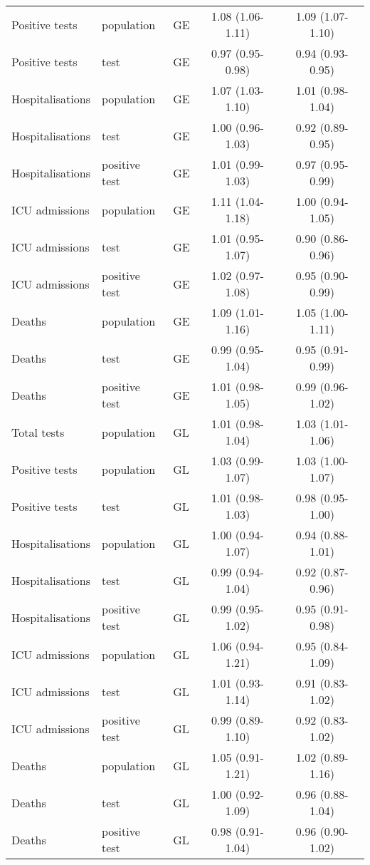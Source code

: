 \documentclass{article}
\begin{document}
\begin{longtable}{lllcc}
		Positive tests & population & GE & 1.08 (1.06-1.11) & 1.09 (1.07-1.10) \\ 
		Positive tests & test & GE & 0.97 (0.95-0.98) & 0.94 (0.93-0.95) \\ 
		Hospitalisations & population & GE & 1.07 (1.03-1.10) & 1.01 (0.98-1.04) \\ 
		Hospitalisations & test & GE & 1.00 (0.96-1.03) & 0.92 (0.89-0.95) \\ 
		Hospitalisations & positive test & GE & 1.01 (0.99-1.03) & 0.97 (0.95-0.99) \\ 
		ICU admissions & population & GE & 1.11 (1.04-1.18) & 1.00 (0.94-1.05) \\ 
		ICU admissions & test & GE & 1.01 (0.95-1.07) & 0.90 (0.86-0.96) \\ 
		ICU admissions & positive test & GE & 1.02 (0.97-1.08) & 0.95 (0.90-0.99) \\ 
		Deaths & population & GE & 1.09 (1.01-1.16) & 1.05 (1.00-1.11) \\ 
		Deaths & test & GE & 0.99 (0.95-1.04) & 0.95 (0.91-0.99) \\ 
		Deaths & positive test & GE & 1.01 (0.98-1.05) & 0.99 (0.96-1.02) \\ 
		Total tests & population & GL & 1.01 (0.98-1.04) & 1.03 (1.01-1.06) \\ 
		Positive tests & population & GL & 1.03 (0.99-1.07) & 1.03 (1.00-1.07) \\ 
		Positive tests & test & GL & 1.01 (0.98-1.03) & 0.98 (0.95-1.00) \\ 
		Hospitalisations & population & GL & 1.00 (0.94-1.07) & 0.94 (0.88-1.01) \\ 
		Hospitalisations & test & GL & 0.99 (0.94-1.04) & 0.92 (0.87-0.96) \\ 
		Hospitalisations & positive test & GL & 0.99 (0.95-1.02) & 0.95 (0.91-0.98) \\ 
		ICU admissions & population & GL & 1.06 (0.94-1.21) & 0.95 (0.84-1.09) \\ 
		ICU admissions & test & GL & 1.01 (0.93-1.14) & 0.91 (0.83-1.02) \\ 
		ICU admissions & positive test & GL & 0.99 (0.89-1.10) & 0.92 (0.83-1.02) \\ 
		Deaths & population & GL & 1.05 (0.91-1.21) & 1.02 (0.89-1.16) \\ 
		Deaths & test & GL & 1.00 (0.92-1.09) & 0.96 (0.88-1.04) \\ 
		Deaths & positive test & GL & 0.98 (0.91-1.04) & 0.96 (0.90-1.02) \\ 

\end{longtable}
\end{document}
